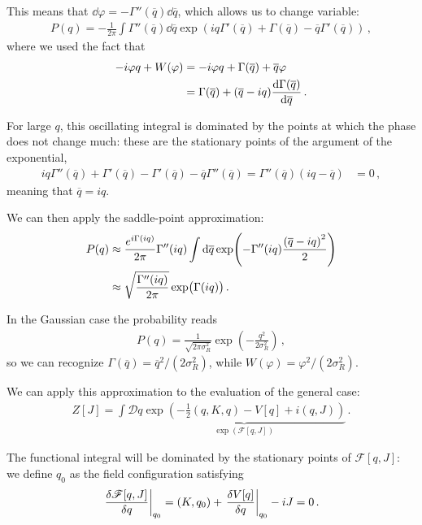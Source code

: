 \documentclass[main.tex]{subfiles}
\begin{document}
This means that \(\dd{\varphi } = - \Gamma'' (\overline{q}) \dd{\overline{q}}\), which allows us to change variable: 
%
\begin{align}
P(q) = -\frac{1}{2 \pi } \int \Gamma '' (\overline{q}) \dd{\overline{q}}
\exp( i q \Gamma '(\overline{q}) + \Gamma (\overline{q}) - \overline{q} \Gamma ' (\overline{q}))
\,,
\end{align}
%
where we used the fact that 
%
\begin{align}
- i \varphi q + W(\varphi ) &= - i \varphi q + \Gamma (\overline{q}) + \overline{q} \varphi    \\
&= \Gamma (\overline{q}) + (\overline{q} - iq) \dv{\Gamma (\overline{q})}{\overline{q}}
\,.
\end{align}

For large \(q\), this oscillating integral is dominated by the points at which the phase does not change much: these are the stationary points of the argument of the exponential, 
%
\begin{align}
iq \Gamma'' (\overline{q})  
+ \Gamma '(\overline{q}) - \Gamma '(\overline{q}) - \overline{q} \Gamma '' (\overline{q}) 
=
\Gamma'' (\overline{q}) (iq - \overline{q} )
&= 0
\,,
\end{align}
%
meaning that \(\overline{q} = iq\).

We can then apply the saddle-point approximation: 
%
\begin{align}
P(q) &\approx \frac{e^{i \Gamma (iq)}}{2 \pi } \Gamma '' (iq)
\int \dd{\overline{q}} \exp(- \Gamma ''(iq) \frac{\qty(\overline{q} - iq)^2}{2})  \\
&\approx \sqrt{\frac{\Gamma '' (iq)}{2 \pi }} \exp(\Gamma (iq))
\,.
\end{align}

In the Gaussian case the probability reads 
%
\begin{align}
P(q) = \frac{1}{\sqrt{2 \pi \sigma _R^2}} \exp(- \frac{q^2}{2 \sigma _R^2})
\,,
\end{align}
%
so we can recognize \(\Gamma (\overline{q}) = \overline{q}^2 / (2 \sigma _R^2)\), while \(W (\varphi ) = \varphi^2 / (2 \sigma _R^2)\). 

We can apply this approximation to the evaluation of the general case: 
%
\begin{align}
Z[J] = \int \mathcal{D}q \underbrace{\exp(- \frac{1}{2} (q, K, q) - V[q] + i (q, J))}_{\exp(\mathscr{F}[q, J])}
\,.
\end{align}

The functional integral will be dominated by the stationary points of \(\mathscr{F}[q, J]\): we define \(q_0 \) as the field configuration satisfying
%
\begin{align} \label{eq:functional-equation-for-q0}
\eval{\fdv{\mathscr{F}[q, J]}{q}}_{q_0 } = (K, q_0 ) + \eval{\fdv{V[q]}{q}}_{q_0 } - iJ = 0
\,.
\end{align}
\end{document}
